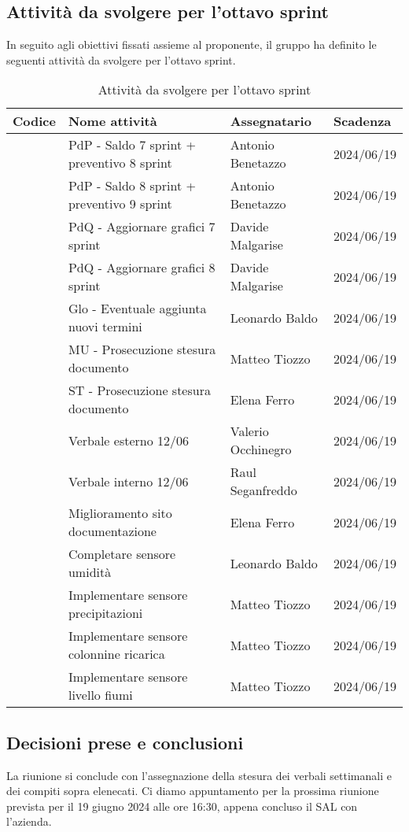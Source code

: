 \documentclass[italian,12pt]{article}
\begin{document}
\newpage

\subsection{Attività da svolgere per l'ottavo sprint}
In seguito agli obiettivi fissati assieme al proponente, il gruppo ha definito le seguenti attività da svolgere per l'ottavo sprint.

\begin{table}[!h]
	\centering
	\begin{tabular}{ |l||l|l|l| }
		\hline
		\textbf{Codice}    & \textbf{Nome attività}                     & \textbf{Assegnatario} & \textbf{Scadenza} \\
		\hline
		\mySkip[86bz7hfxp] & PdP - Saldo 7 sprint + preventivo 8 sprint & Antonio Benetazzo     & 2024/06/19 \\
		\mySkip[86bz8e6c7] & PdP - Saldo 8 sprint + preventivo 9 sprint & Antonio Benetazzo     & 2024/06/19 \\
		\mySkip[86bz7hfyc] & PdQ - Aggiornare grafici 7 sprint          & Davide Malgarise      & 2024/06/19 \\
		\mySkip[86bz8e48h] & PdQ - Aggiornare grafici 8 sprint          & Davide Malgarise      & 2024/06/19 \\
		\mySkip[86bz8e8fx] & Glo - Eventuale aggiunta nuovi termini     & Leonardo Baldo        & 2024/06/19 \\
		\mySkip[86bz7hg4z] & MU - Prosecuzione stesura documento        & Matteo Tiozzo         & 2024/06/19 \\
		\mySkip[86bz7hg4d] & ST - Prosecuzione stesura documento        & Elena Ferro           & 2024/06/19 \\
		\mySkip[86bz7hftu] & Verbale esterno 12/06                      & Valerio Occhinegro    & 2024/06/19 \\
		\mySkip[86bz7hfu3] & Verbale interno 12/06                      & Raul Seganfreddo      & 2024/06/19 \\
		\mySkip[86bz8dwn3] & Miglioramento sito documentazione          & Elena Ferro           & 2024/06/19 \\
		\mySkip[86bz7hfte] & Completare sensore umidità                 & Leonardo Baldo        & 2024/06/19 \\
		\mySkip[86bz8dufz] & Implementare sensore precipitazioni        & Matteo Tiozzo         & 2024/06/19 \\
		\mySkip[86bz8duk3] & Implementare sensore colonnine ricarica    & Matteo Tiozzo         & 2024/06/19 \\
		\mySkip[86bz8dwdy] & Implementare sensore livello fiumi         & Matteo Tiozzo         & 2024/06/19 \\
		\hline
	\end{tabular}
	\caption{Attività da svolgere per l'ottavo sprint}
\end{table}

\subsection{Decisioni prese e conclusioni}
La riunione si conclude con l'assegnazione della stesura dei verbali settimanali e dei compiti sopra elenecati. Ci diamo appuntamento per la prossima riunione prevista per il 19 giugno 2024 alle ore 16:30, appena concluso il SAL con l'azienda.
\end{document}

